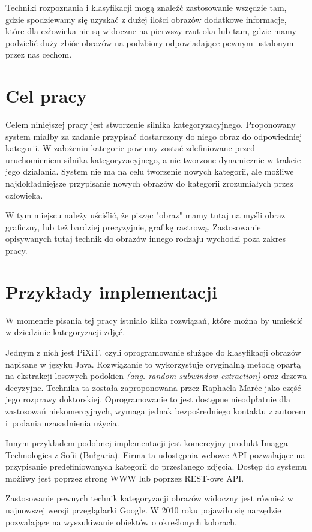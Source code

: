 Techniki rozpoznania i klasyfikacji mogą znaleźć zastosowanie wszędzie tam, gdzie spodziewamy się uzyskać z dużej ilości obrazów dodatkowe informacje, które dla człowieka nie są widoczne na pierwszy rzut oka lub tam, gdzie mamy podzielić duży zbiór obrazów na podzbiory odpowiadające pewnym ustalonym przez nas cechom.

\section*{Cel pracy}
Celem niniejszej pracy jest stworzenie silnika kategoryzacyjnego. Proponowany system miałby za zadanie przypisać dostarczony do niego obraz do odpowiedniej kategorii. W założeniu kategorie powinny zostać zdefiniowane przed uruchomieniem silnika kategoryzacyjnego, a nie tworzone dynamicznie w trakcie jego działania. System nie ma na celu tworzenie nowych kategorii, ale możliwe najdokładniejsze przypisanie nowych obrazów do kategorii zrozumiałych przez człowieka.

W tym miejscu należy uściślić, że pisząc "obraz" mamy tutaj na myśli obraz graficzny, lub też bardziej precyzyjnie, grafikę rastrową. Zastosowanie opisywanych tutaj technik do obrazów innego rodzaju wychodzi poza zakres pracy.

\section*{Przykłady implementacji}
W momencie pisania tej pracy istniało kilka rozwiązań, które można by umieścić w dziedzinie kategoryzacji zdjęć.

Jednym z nich jest PiXiT, czyli oprogramowanie służące do klasyfikacji obrazów napisane w języku Java. Rozwiązanie to wykorzystuje oryginalną metodę opartą na ekstrakcji losowych podokien \emph{(ang. random subwindow extraction)} oraz drzewa decyzyjne. Technika ta została zaproponowana przez Raphaëla Marée jako część jego rozprawy doktorskiej. Oprogramowanie to jest dostępne nieodpłatnie dla zastosowań niekomercyjnych, wymaga jednak bezpośredniego kontaktu z autorem i~podania uzasadnienia użycia\cite{PIXIT}.

Innym przykładem podobnej implementacji jest komercyjny produkt Imagga Technologies z Sofii (Bułgaria). Firma ta udostępnia webowe API pozwalające na przypisanie predefiniowanych kategorii do przesłanego zdjęcia. Dostęp do systemu możliwy jest poprzez stronę WWW lub poprzez REST-owe API\cite{IMAGGA}.

Zastosowanie pewnych technik kategoryzacji obrazów widoczny jest również w najnowszej wersji przeglądarki Google. W 2010 roku pojawiło się narzędzie pozwalające na wyszukiwanie obiektów o określonych kolorach\cite{Google2010}.

